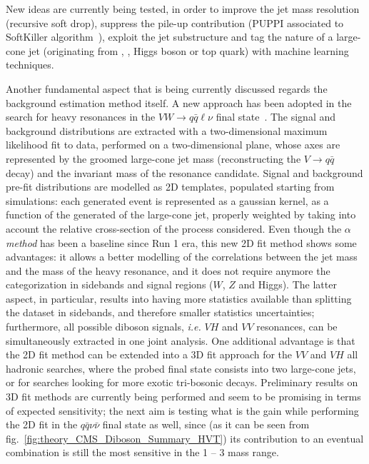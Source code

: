 \noindent New ideas are currently being tested, in order to improve the jet mass resolution (recursive soft drop), suppress the pile-up contribution (PUPPI associated to SoftKiller algorithm~\cite{Cacciari:2014gra}), exploit the jet substructure and tag the nature of a large-cone jet (originating from \W, \Z, Higgs boson or top quark) with machine learning techniques. %

\noindent Another fundamental aspect that is being currently discussed regards the background estimation method itself. A new approach has been adopted in the search for heavy resonances in the $VW \rightarrow q \bar{q} \ell \nu$ final state~\cite{CMS-PAS-B2G-16-029}. The signal and background distributions are extracted with a two-dimensional maximum likelihood fit to data, performed on a two-dimensional plane, whose axes are represented by the groomed large-cone jet mass (reconstructing the $V \rightarrow q \bar{q}$ decay) and the invariant mass of the resonance candidate. Signal and background pre-fit distributions are modelled as 2D templates, populated starting from simulations: each generated event is represented as a gaussian kernel, as a function of the generated \pt of the large-cone jet, properly weighted by taking into account the relative cross-section of the process considered. Even though the \emph{$\alpha$ method} has been a baseline since Run 1 era, this new 2D fit method shows some advantages: it allows a better modelling of the correlations between the jet mass and the mass of the heavy resonance, and it does not require anymore the categorization in sidebands and signal regions ($W$, $Z$ and Higgs). The latter aspect, in particular, results into having more statistics available than splitting the dataset in sidebands, and therefore smaller statistics uncertainties; furthermore, all possible diboson signals, \textit{i.e.} $VH$ and $VV$ resonances, can be simultaneously extracted in one joint analysis. One additional advantage is that the 2D fit method can be extended into a 3D fit approach for the $VV$ and $VH$ all hadronic searches, where the probed final state consists into two large-cone jets, or for searches looking for more exotic tri-bosonic decays. Preliminary results on 3D fit methods are currently being performed and seem to be promising in terms of expected sensitivity; the next aim is testing what is the gain while performing the 2D fit in the $q \bar{q} \nu \bar{\nu}$ final state as well, since (as it can be seen from fig.~\ref{fig:theory_CMS_Diboson_Summary_HVT}) its contribution to an eventual combination is still the most sensitive in the 1 \TeV -- 3 \TeV mass range.

\clearpage

